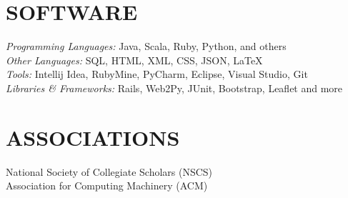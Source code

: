 \documentclass[margin]{res}
\begin{document}
\begin{resume}
\section{SOFTWARE} 
                {\sl Programming Languages:} Java, Scala, Ruby, Python, and others \\
                {\sl Other Languages:} SQL, HTML, XML, CSS, JSON, LaTeX \\ 
                {\sl Tools:} Intellij Idea, RubyMine, PyCharm, Eclipse, Visual Studio, Git \\
                {\sl Libraries \& Frameworks:} Rails, Web2Py, JUnit, Bootstrap, Leaflet and more 
 
\section{ASSOCIATIONS}             
                National Society of Collegiate Scholars (NSCS) \\
                Association for Computing Machinery (ACM)         
            
\end{resume}
\end{document}
